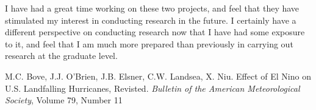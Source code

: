 \documentclass[a4paper,12pt]{article}
\begin{document}
I have had a great time working on these two projects, and feel that they have stimulated my interest in conducting research in the future.  I certainly have a different perspective on conducting research now that I have had some exposure to it, and feel that I am much more prepared than previously in carrying out research at the graduate level.  
\begin{thebibliography}{9} \vspace{-1ex}
\footnotesize
{}M.C. Bove, J.J. O'Brien, J.B. Elsner, C.W. Landsea, X. Niu.  Effect of El Nino on U.S. Landfalling Hurricanes, Revisted.  \textit{Bulletin of the American Meteorological Society}, Volume 79, Number 11
\end{thebibliography}
\end{document}
